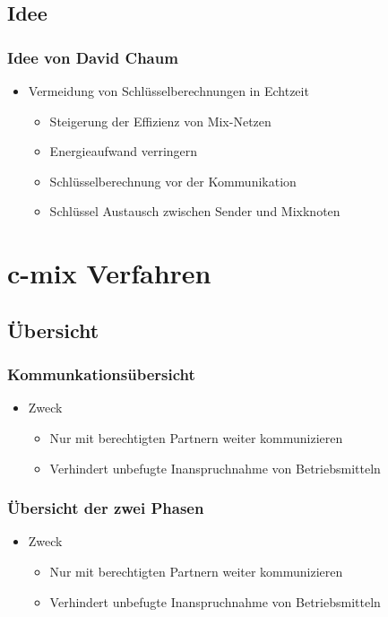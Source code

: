 \documentclass[t, xcolor=dvipsnames]{beamer}
\begin{document}
\subsection{Idee} %
\begin{frame}
	\frametitle{Idee von David Chaum}
	\begin{itemize}
		\item Vermeidung von Schlüsselberechnungen in Echtzeit 
			\begin{itemize}
				\item Steigerung der Effizienz von Mix-Netzen
				\item Energieaufwand verringern
				\item Schlüsselberechnung vor der Kommunikation
				\item Schlüssel Austausch zwischen Sender und Mixknoten
			\end{itemize}
	\end{itemize}
	\vspace{\fill}
\end{frame}


\section{c-mix Verfahren} %
\subsection{Übersicht} %
\begin{frame}
	\frametitle{Kommunkationsübersicht}
	\begin{itemize}
		\item Zweck
			\begin{itemize}
				\item Nur mit \alert{berechtigten Partnern} weiter kommunizieren
				\item Verhindert unbefugte Inanspruchnahme von Betriebsmitteln
			\end{itemize}
	\end{itemize}
	\vspace{\fill}
\end{frame}

\begin{frame}
	\frametitle{Übersicht der zwei Phasen}
	\begin{itemize}
		\item Zweck
			\begin{itemize}
				\item Nur mit \alert{berechtigten Partnern} weiter kommunizieren
				\item Verhindert unbefugte Inanspruchnahme von Betriebsmitteln
			\end{itemize}
	\end{itemize}
	\vspace{\fill}
\end{frame}
\end{document}
